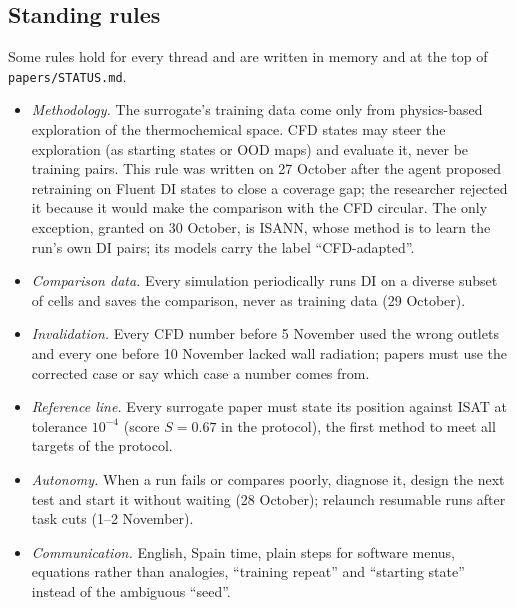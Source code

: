 \documentclass[preprint,review,12pt]{elsarticle}
\begin{document}
\subsection{Standing rules}\label{sec:rules}
Some rules hold for every thread and are written in memory and at the top of \texttt{papers/STATUS.md}.
\begin{itemize}
\item \emph{Methodology.} The surrogate's training data come only from physics-based exploration of the thermochemical
space. CFD states may steer the exploration (as starting states or OOD maps) and evaluate it, never be training pairs.
This rule was written on 27 October after the agent proposed retraining on Fluent DI states to close a coverage gap;
the researcher rejected it because it would make the comparison with the CFD circular. The only exception, granted on
30 October, is ISANN, whose method is to learn the run's own DI pairs; its models carry the label ``CFD-adapted''.
\item \emph{Comparison data.} Every simulation periodically runs DI on a diverse subset of cells and saves the
comparison, never as training data (29 October).
\item \emph{Invalidation.} Every CFD number before 5 November used the wrong outlets and every one before 10 November
lacked wall radiation; papers must use the corrected case or say which case a number comes from.
\item \emph{Reference line.} Every surrogate paper must state its position against ISAT at tolerance $10^{-4}$ (score
$S=0.67$ in the protocol), the first method to meet all targets of the protocol.
\item \emph{Autonomy.} When a run fails or compares poorly, diagnose it, design the next test and start it without
waiting (28 October); relaunch resumable runs after task cuts (1--2 November).
\item \emph{Communication.} English, Spain time, plain steps for software menus, equations rather than analogies,
``training repeat'' and ``starting state'' instead of the ambiguous ``seed''.
\end{itemize}
\end{document}
